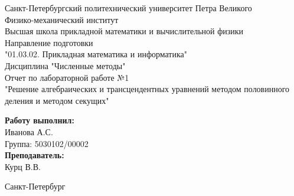 \begin{titlepage}	%

	\begin{center}		%

		\large Санкт-Петербургский политехнический университет Петра Великого\\
		\large Физико-механический институт \\
		\large Высшая школа прикладной математики и вычислительной физики\\[3cm]
		\large Направление подготовки\\
		\large "01.03.02. Прикладная математика и информатика"\\[3cm]
		\huge Дисциплина "Численные методы"\\[0.5cm] %
		\large Отчет по лабораторной работе №1\\[0.1cm]
		\large "Решение алгебраических и трансцендентных уравнений методом половинного деления и методом секущих"\\[5cm]

	\end{center}


	\begin{flushright} %
		\begin{minipage}{0.25\textwidth} %
			\begin{flushleft} %

				\large\textbf{Работу выполнил:}\\
				\large Иванова А.С.\\
				\large {Группа:} 5030102/00002\\
				
				\large \textbf{Преподаватель:}\\
				\large Курц В.В.

			\end{flushleft}
		\end{minipage}
	\end{flushright}
	
	\vfill %

	\begin{center}
	\large Санкт-Петербург\\
	\large \the\year %
	\end{center} %

\end{titlepage} %

\vfill %
